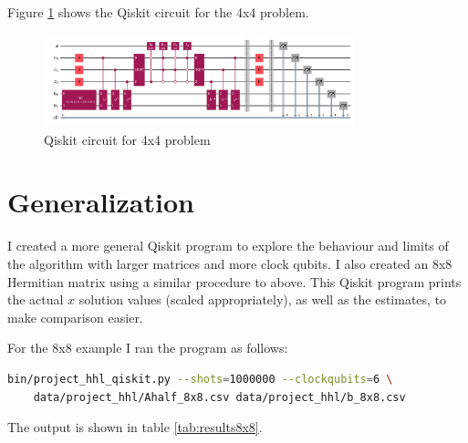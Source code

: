 \documentclass[12pt]{extarticle}
\begin{document}
Figure \ref{fig:hhl_4x4_qiskit} shows the Qiskit circuit for the 4x4 problem.
\begin{figure}[H]
\centering
\includegraphics[width=0.80\textwidth]{images/project_hhl_4x4.png}
\caption{Qiskit circuit for 4x4 problem}
\label{fig:hhl_4x4_qiskit}
\end{figure}

\section{Generalization}\label{sec:generalization}

I created a more general Qiskit program to explore the behaviour and limits of the algorithm with larger matrices and more clock qubits.
I also created an 8x8 Hermitian matrix using a similar procedure to above.
This Qiskit program prints the actual $x$ solution values (scaled appropriately), as well as the estimates, to make comparison easier.

For the 8x8 example I ran the program as follows:
\begin{lstlisting}[language=Bash]
bin/project_hhl_qiskit.py --shots=1000000 --clockqubits=6 \
    data/project_hhl/Ahalf_8x8.csv data/project_hhl/b_8x8.csv
\end{lstlisting}

The output is shown in table \ref{tab:results8x8}.
\end{document}
